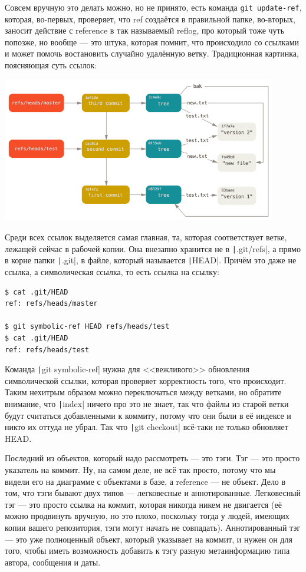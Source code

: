 \documentclass[a5paper]{article}
\begin{document}
Совсем вручную это делать можно, но не принято, есть команда \verb|git update-ref|, которая, во-первых, проверяет, что ref создаётся в правильной папке, во-вторых, заносит действие с reference в так называемый reflog, про который тоже чуть попозже, но вообще --- это штука, которая помнит, что происходило со ссылками и может помочь востановить случайно удалённую ветку. Традиционная картинка, поясняющая суть ссылок:

\begin{center}
	\includegraphics[width=0.9\textwidth]{gitRefs.png}
\end{center}

Среди всех ссылок выделяется самая главная, та, которая соответствует ветке, лежащей сейчас в рабочей копии. Она внезапно хранится не в \texttt|.git/refs|, а прямо в корне папки \texttt|.git|, в файле, который называется \texttt|HEAD|. Причём это даже не ссылка, а символическая ссылка, то есть ссылка на ссылку:

\begin{verbatim}
$ cat .git/HEAD
ref: refs/heads/master

$ git symbolic-ref HEAD refs/heads/test
$ cat .git/HEAD
ref: refs/heads/test
\end{verbatim}

Команда \texttt|git symbolic-ref| нужна для <<вежливого>> обновления символической ссылки, которая проверяет корректность того, что происходит. Таким нехитрым образом можно переключаться между ветками, но обратите внимание, что \texttt|index| ничего про это не знает, так что файлы из старой ветки будут считаться добавленными к коммиту, потому что они были в её индексе и никто их оттуда не убрал. Так что \texttt|git checkout| всё-таки не только обновляет HEAD.

Последний из объектов, который надо рассмотреть --- это тэги. Тэг --- это просто указатель на коммит. Ну, на самом деле, не всё так просто, потому что мы видели его на диаграмме с объектами в базе, а reference --- не объект. Дело в том, что тэги бывают двух типов --- легковесные и аннотированные. Легковесный тэг --- это просто ссылка на коммит, которая никогда никем не двигается (её можно продвинуть вручную, но это плохо, поскольку тогда у людей, имеющих копии вашего репозитория, тэги могут начать не совпадать). Аннотированный тэг --- это уже полноценный объект, который указывает на коммит, и нужен он для того, чтобы иметь возможность добавить к тэгу разную метаинформацию типа автора, сообщения и даты.
\end{document}
